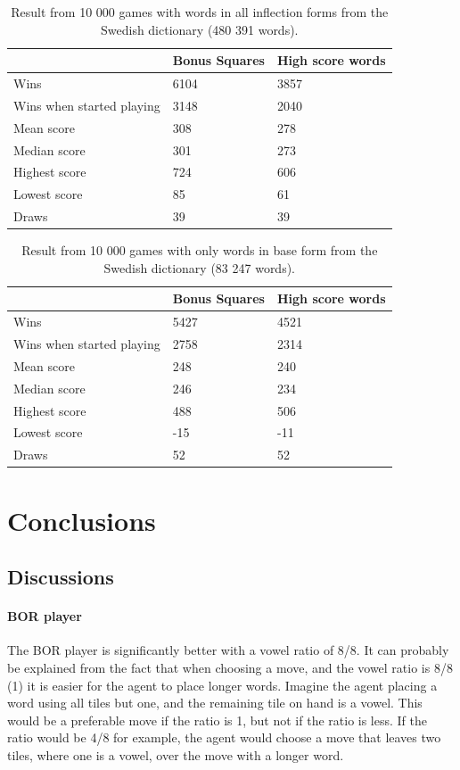 \documentclass[a4paper, 12pt]{report}
\begin{document}
\begin{table}[h]
\centering
    \begin{tabular}{ l | l | l }
   	& Bonus Squares & High score words \\
   	\hline
   	Wins & 6104 & 3857 \\
	Wins when started playing & 3148 & 2040 \\   	
	Mean score & 308 & 278 \\
	Median score & 301 & 273 \\	 	 
	Highest score & 724 & 606 \\
	Lowest score & 85 & 61 \\		
	\hline 
   	Draws & 39 & 39 \\
    \end{tabular}
\caption{Result from 10 000 games with words in all inflection forms from the Swedish dictionary (480 391 words).}
\label{table:bs+hsw+allwords}
\end{table}

\begin{table}[h]
\centering
    \begin{tabular}{ l | l | l }
   	& Bonus Squares & High score words \\
   	\hline
   	Wins & 5427 & 4521 \\
	Wins when started playing & 2758 & 2314 \\   	
	Mean score & 248 & 240 \\
	Median score & 246 & 234 \\	 	 
	Highest score & 488 & 506 \\
	Lowest score & -15 & -11 \\		
	\hline 
   	Draws & 52 & 52 \\
    \end{tabular}
\caption{Result from 10 000 games with only words in base form from the Swedish dictionary (83 247 words).}
\label{table:bs+hsw+baseforms}
\end{table}

\chapter{Conclusions}
\section{Discussions}
\subsubsection{BOR player}
The BOR player is significantly better with a vowel ratio of 8/8. It can probably be explained from the fact that when choosing a move, and the vowel ratio is 8/8 (1) it is easier for the agent to place longer words. Imagine the agent placing a word using all tiles but one, and the remaining tile on hand is a vowel. This would be a preferable move if the ratio is 1, but not if the ratio is less. If the ratio would be 4/8 for example, the agent would choose a move that leaves two tiles, where one is a vowel, over the move with a longer word. 
\end{document}
